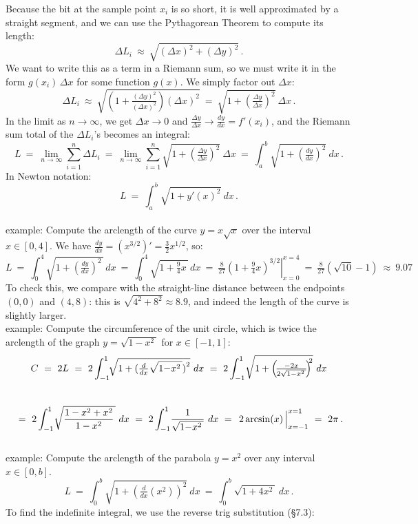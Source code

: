 \documentclass[11pt]{article}
\newcommand{\ts}{\textstyle}
\begin{document}
\noindent
Because the bit at the sample point $x_i$ is so short, 
it is well approximated by a straight segment, and we can 
use the Pythagorean Theorem to compute its length:
$$
\Delta L_i  \ \approx\ \sqrt{(\Delta x)^2+(\Delta y)^2}\,.
$$
We want to write this as a term in a Riemann sum, 
so we must write it in the form $g(x_i)\,\Delta x$ for some function $g(x)$.
We simply factor out $\Delta x$:
$$
\Delta L_i  
\ \approx\ 
\sqrt{\left(1+\tfrac{(\Delta y)^2}{(\Delta x)^2}\right)(\Delta x)^2}
\ =\ 
\sqrt{1+(\tfrac{\Delta y}{\Delta x})^2}\  \Delta x\,.
$$
In the limit as $n\to \infty$, we get $\Delta x\to0$  and $\frac{\Delta y}{\Delta x}\to \frac{dy}{dx} = f'(x_i)$, and the Riemann sum total of the $\Delta L_i$'s becomes an integral:
$$
L \ =\ \lim_{n\to\infty} \sum_{i=1}^n\Delta L_i \ =\ \lim_{n\to\infty}\sum_{i=1}^n\! \sqrt{1+(\tfrac{\Delta y}{\Delta x})^2}\ \Delta x
\ = \ \int_a^b\!\!\! \sqrt{1+(\tfrac{dy}{dx})^2}\ dx\,.
$$
In Newton notation:
$$
L  \ = \ \int_a^b\!\!\! \sqrt{1+y'(x)^2}\ dx\,.
$$
\\[.5em]
{\sc example:} Compute the arclength of the curve $y=x\sqrt x$ over the
interval $x\in[0,4]$. We have $\frac{dy}{dx} = (x^{3/2})' = \frac32x^{1/2}$,
so:
$$
L 
\ =\
\int_0^4 \sqrt{1+(\tfrac{dy}{dx})^2\,}\,dx
\ =\
\int_0^4 \sqrt{1+\tfrac94x\,}\,dx
\ =\
\left.\tfrac{8}{27} (1{+}\tfrac94x)^{3/2}\right|_{x=0}^{x=4}
\ =\
\tfrac{8}{27}(\sqrt{10}{-}1)
\ \approx\ 9.07
$$
To check this, we compare with the straight-line distance between the endpoints
$(0,0)$ and $(4, 8)$: this is $\sqrt{4^2+8^2} \approx 8.9$, and indeed the
length of the curve is slightly larger.
\\[.5em]
{\sc example:} Compute the circumference of the unit circle,
which is twice the arclength of the graph $y=\sqrt{1{-}x^2\,}$ for $x\in[-1,1]$:
$$
C  \ =\ 2L
\ = \ 
2\int_{-1}^1\!\! \sqrt{1+\left(\smash{\tfrac{d}{dx}\sqrt{1{-}x^2\,}}\right)^2}\ dx
\ = \ 
2\int_{-1}^1\! \sqrt{1+\left(\! \tfrac{-2x} {2\sqrt{1{-}x^2\,} }\!\right)^{\!\!2}}\ dx
$$
\\[-1em]
$$
\ = \ 
2\int_{-1}^1\! \sqrt{ \frac{1-x^2+x^2}{1-x^2} \,}\ dx
\ = \ 
2\int_{-1}^1\! \frac{1}{ \sqrt{1{-}x^2\,} }\ dx
\ =\
\left.\vphantom{\sum}2\arcsin(x)\,\right|_{x=-1}^{x=1}
\ =\
2\pi\,.
$$
\\[.5em]
{\sc example:} Compute the arclength of the parabola $y=x^2$ over any
interval $x\in[0,b]$.
$$
L 
\ =\
\int_0^b\!\!\! {\ts \sqrt{1+(\tfrac{d}{dx}(x^2))^2}}\ dx
\ =\ 
\int_0^b\!\!\! {\ts \sqrt{1+4x^2\,}}\ dx\,.
$$
To find the indefinite integral, we use the reverse trig substitution (\S7.3):
\end{document}
